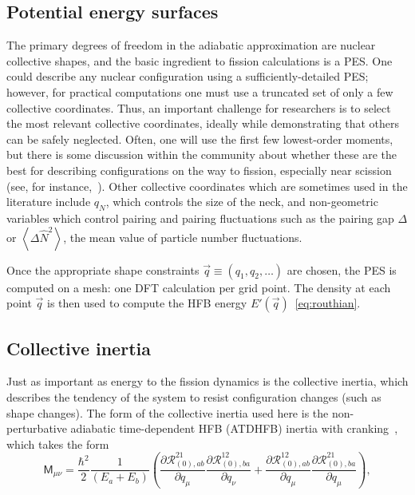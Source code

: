 \subsection{Potential energy surfaces}
The primary degrees of freedom in the adiabatic approximation are nuclear collective shapes, and the basic ingredient to fission calculations is a PES. One could describe any nuclear configuration using a sufficiently-detailed PES; however, for practical computations one must use a truncated set of only a few collective coordinates. Thus, an important challenge for researchers is to select the most relevant collective coordinates, ideally while demonstrating that others can be safely neglected. Often, one will use the first few lowest-order moments, but there is some discussion within the community about whether these are the best for describing configurations on the way to fission, especially near scission (see, for instance,~\cite{younes2012}). Other collective coordinates which are sometimes used in the literature include $q_N$, which controls the size of the neck, and non-geometric variables which control pairing and pairing fluctuations such as the pairing gap $\Delta$ or $\left\langle \Delta \hat{N}^2 \right\rangle$, the mean value of particle number fluctuations.

Once the appropriate shape constraints $\vec{q}\equiv(q_1, q_2, \dots)$ are chosen, the PES is computed on a mesh: one DFT calculation per grid point. The density at each point $\vec{q}$ is then used to compute the HFB energy $E'(\vec{q})$~\eqref{eq:routhian}.

\subsection{Collective inertia}
Just as important as energy to the fission dynamics is the collective inertia, which describes the tendency of the system to resist configuration changes (such as shape changes). The form of the collective inertia used here is the non-perturbative adiabatic time-dependent HFB (ATDHFB) inertia with cranking~\cite{Baran2011}, which takes the form
\begin{equation}\label{eq:mATDHFB-np}
\mathsf{M}_{\mu\nu} =  \frac{\hbar^2}{2}\frac{1}{(E_a+E_b)}\left(\frac{\partial\mathcal{R}^{21}_{(0),ab}}{\partial q_\mu}\frac{\partial\mathcal{R}^{12}_{(0),ba}}{\partial q_\nu}+\frac{\partial\mathcal{R}^{12}_{(0),ab}}{\partial q_\mu}\frac{\partial\mathcal{R}^{21}_{(0),ba}}{\partial q_\mu}\right),
\end{equation}

